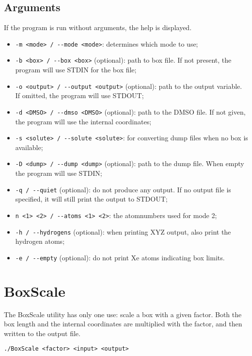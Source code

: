 \section{Arguments}
If the program is run without arguments, the help is displayed.

\begin{itemize}
	\item \verb|-m <mode> / --mode <mode>|: determines which mode to use;
	\item \verb|-b <box> / --box <box>| (optional): path to box file. If not 
	present, the program will use STDIN for the box file;
	\item \verb|-o <output> / --output <output>| (optional): path to the output 
	variable. If omitted, the program will use STDOUT;
	\item \verb|-d <DMSO> / --dmso <DMSO>| (optional): path to the DMSO file. 
	If not given, the program will use the internal coordinates;
	\item \verb|-s <solute> / --solute <solute>|: for converting dump files 
	when no box is available;
	\item \verb|-D <dump> / --dump <dump>| (optional): path to the dump file. 
	When empty the program will use STDIN;
	\item \verb|-q / --quiet| (optional): do not produce any output. If no 
	output file is 
	specified, it will still print the output to STDOUT;
	\item \verb|n <1> <2> / --atoms <1> <2>|: the atomnumbers used for mode 2;
	\item \verb|-h / --hydrogens| (optional): when printing XYZ output, also 
	print the hydrogen atoms;
	\item \verb|-e / --empty| (optional): do not print Xe atoms indicating box 
	limits.
\end{itemize}

\chapter{BoxScale}
The BoxScale utility has only one use: scale a box with a given factor. Both 
the box length and the internal coordinates are multiplied with the factor, and 
then written to the output file.

\begin{lstlisting}[caption=BoxScale]
	./BoxScale <factor> <input> <output>
\end{lstlisting}